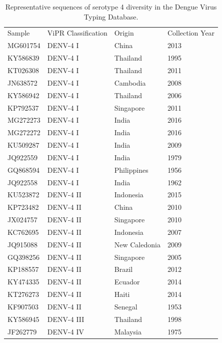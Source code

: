 \begin{longtable}{@{}llll@{}}
\caption{Representative sequences of serotype 4 diversity in the Dengue Virus Typing Database.}
\label{tab:chap4_s10}\\
Sample   & ViPR Classification & Origin        & Collection Year \\
MG601754 & DENV-4 I            & China         & 2013            \\
KY586839 & DENV-4 I            & Thailand      & 1995            \\
KT026308 & DENV-4 I            & Thailand      & 2011            \\
JN638572 & DENV-4 I            & Cambodia      & 2008            \\
KY586942 & DENV-4 I            & Thailand      & 2006            \\
KP792537 & DENV-4 I            & Singapore     & 2011            \\
MG272273 & DENV-4 I            & India         & 2016            \\
MG272272 & DENV-4 I            & India         & 2016            \\
KU509287 & DENV-4 I            & India         & 2009            \\
JQ922559 & DENV-4 I            & India         & 1979            \\
GQ868594 & DENV-4 I            & Philippines   & 1956            \\
JQ922558 & DENV-4 I            & India         & 1962            \\
KU523872 & DENV-4 II           & Indonesia     & 2015            \\
KP723482 & DENV-4 II           & China         & 2010            \\
JX024757 & DENV-4 II           & Singapore     & 2010            \\
KC762695 & DENV-4 II           & Indonesia     & 2007            \\
JQ915088 & DENV-4 II           & New Caledonia & 2009            \\
GQ398256 & DENV-4 II           & Singapore     & 2005            \\
KP188557 & DENV-4 II           & Brazil        & 2012            \\
KY474335 & DENV-4 II           & Ecuador       & 2014            \\
KT276273 & DENV-4 II           & Haiti         & 2014            \\
KF907503 & DENV-4 II           & Senegal       & 1953            \\
KY586945 & DENV-4 III          & Thailand      & 1998            \\
JF262779 & DENV-4 IV           & Malaysia      & 1975           
\end{longtable}


